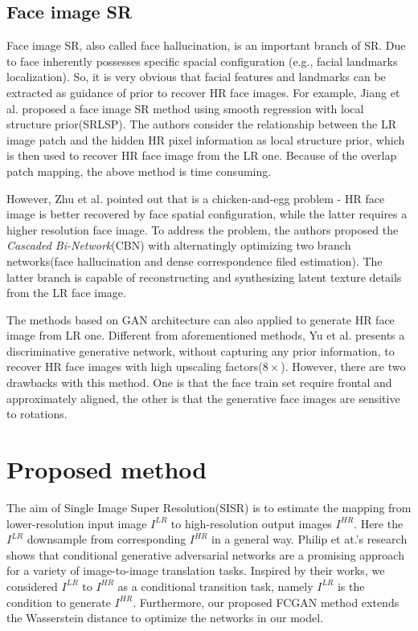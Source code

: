 \documentclass[conference,compsoc]{IEEEtran}
\begin{document}
\subsection{Face image SR}

Face image SR, also called face hallucination, is an important branch of SR. Due to face inherently possesses specific spacial configuration (e.g., facial landmarks localization). So, it is very obvious that facial features and landmarks can be extracted as guidance of prior to recover HR face images. For example, Jiang et al.\cite{Jiang2016Noise-TCYB, Jiang2016SRLSP} proposed a face image SR method using smooth regression with local structure prior(SRLSP). The authors consider the relationship between the LR image patch and the hidden HR pixel information as local structure prior, which is then used to recover HR face image from the LR one. Because of the overlap patch mapping, the above method is time consuming.

However, Zhu et al.\cite{zhu2016deep} pointed out that is a chicken-and-egg problem - HR face image is better recovered by face spatial configuration, while the latter requires a higher resolution face image.  To address the problem, the authors proposed the \textit{Cascaded Bi-Network}(CBN) with alternatingly optimizing two branch networks(face hallucination and dense correspondence filed estimation). The latter branch is capable of reconstructing and synthesizing latent texture details from the LR face image.

The methods based on GAN architecture can also applied to generate HR face image from LR one. Different from aforementioned methods\cite{zhu2016deep, Jiang2016Noise-TCYB, Jiang2016SRLSP}, Yu et al. \cite{Yu-URGAN-ECCV2016} presents a discriminative generative network, without capturing any prior information, to recover HR face images with high upscaling factors($8\times$). However, there are two drawbacks with this method. One is that the face train set require frontal and approximately aligned, the other is that the generative face images are sensitive to rotations.


\section{Proposed method}
\label{gen_inst}

The aim of Single Image Super Resolution(SISR) is to estimate the mapping from lower-resolution input image $I^{LR}$ to high-resolution output images $I^{HR}$. Here the $I^{LR}$ downsample from corresponding $I^{HR}$ in a general way. Philip et at.'s\cite{pix2pix} research shows that conditional generative adversarial networks\cite{mirza2014conditionalGAN} are a promising approach for a variety of image-to-image translation tasks. Inspired by their works\cite{mirza2014conditionalGAN, pix2pix}, we considered $I^{LR}$ to $I^{HR}$ as a conditional transition task, namely $I^{LR}$ is the condition to generate $I^{HR}$. Furthermore, our proposed FCGAN method extends the Wasserstein distance\cite{Arjovsky2017TowardsWGAN, Arjovsky2017WGAN, David-BEGAN2017} to optimize the networks in our model.
\end{document}
